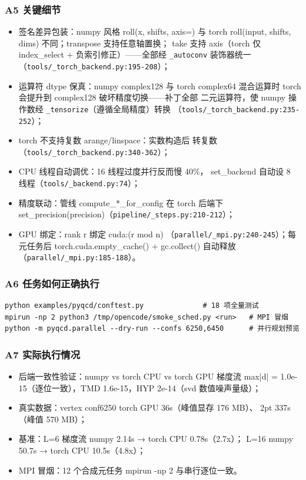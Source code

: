 \documentclass[UTF8]{ctexart}
\begin{document}
\subsubsection{A5 关键细节}
\begin{itemize}
\item \textcolor{struct}{签名差异包装}：numpy 风格 roll(x, shifts, axis=)
与 torch roll(input, shifts, dims) 不同；transpose 支持任意轴置换；
take 支持 axis（torch 仅 index\_select + 负索引修正）——全部经
\texttt{\nolinkurl{_autoconv}} 装饰器统一（\texttt{\nolinkurl{tools/_torch_backend.py:195-208}}）；
\item \textcolor{struct}{运算符 dtype 保真}：numpy complex128 与 torch
complex64 混合运算时 torch 会提升到 complex128 破坏精度切换——补丁全部
二元运算符，使 numpy 操作数经 \texttt{\nolinkurl{_tensorize}}（遵循全局精度）转换
（\texttt{\nolinkurl{tools/_torch_backend.py:235-252}}）；
\item \textcolor{struct}{torch 不支持复数 arange/linspace}：实数构造后
转复数（\texttt{\nolinkurl{tools/_torch_backend.py:340-362}}）；
\item \textcolor{struct}{CPU 线程自动调优}：16 线程过度并行反而慢 40\%，
set\_backend 自动设 8 线程（\texttt{\nolinkurl{tools/_backend.py:74}}）；
\item \textcolor{struct}{精度联动}：管线 compute\_*\_for\_config 在 torch
后端下 set\_precision(precision)（\texttt{\nolinkurl{pipeline/_steps.py:210-212}}）；
\item \textcolor{struct}{GPU 绑定}：rank r 绑定 cuda:(r mod n)
（\texttt{\nolinkurl{parallel/_mpi.py:240-245}}）；每元任务后
torch.cuda.empty\_cache() + gc.collect() 自动释放
（\texttt{\nolinkurl{parallel/_mpi.py:185-188}}）。
\end{itemize}

\subsubsection{A6 任务如何正确执行}
\begin{verbatim}
python examples/pyqcd/conftest.py              # 18 项全量测试
mpirun -np 2 python3 /tmp/opencode/smoke_sched.py <run>   # MPI 冒烟
python -m pyqcd.parallel --dry-run --confs 6250,6450      # 并行规划预览
\end{verbatim}

\subsubsection{A7 实际执行情况}
\begin{itemize}
\item 后端一致性验证：numpy vs torch CPU vs torch GPU 梯度流 max|d| =
1.0e-15（逐位一致），TMD 1.6e-15，HYP 2e-14（svd 数值噪声量级）；
\item 真实数据：vertex conf6250 torch GPU 36s（峰值显存 176 MB）、
2pt 337s（峰值 570 MB）；
\item 基准：L=6 梯度流 numpy 2.14s → torch CPU 0.78s（2.7x）；
L=16 numpy 50.7s → torch CPU 10.5s（4.8x）；
\item MPI 冒烟：12 个合成元任务 mpirun -np 2 与串行逐位一致。
\end{itemize}
\end{document}
